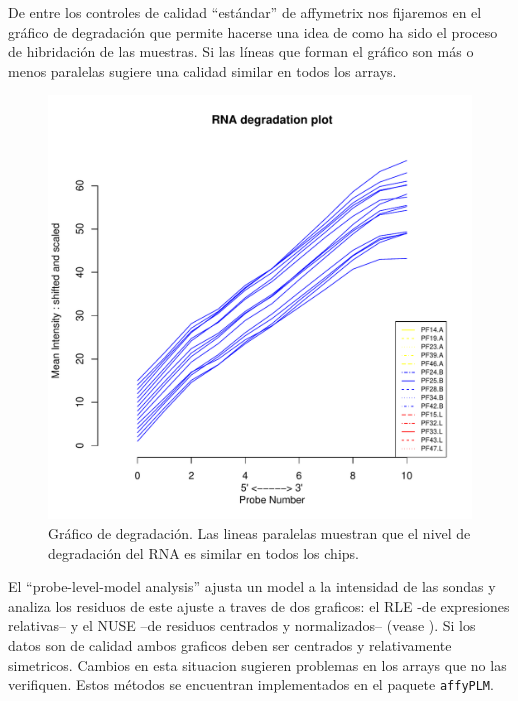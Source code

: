 \documentclass[a4paper]{article}\usepackage[]{graphicx}\usepackage[]{color}
\makeatletter
\def\maxwidth{ %
  \ifdim\Gin@nat@width>\linewidth
    \linewidth
  \else
    \Gin@nat@width
  \fi
}
\newenvironment{knitrout}{}{} %
\newcommand{\Rpackage}[1]{{\texttt{#1}}}
\makeatother
\begin{document}
De entre los controles de calidad ``estándar'' de affymetrix nos fijaremos en el gráfico de degradación que permite hacerse una idea de como ha sido el 
proceso de hibridación de las muestras. Si las líneas que forman el gráfico son más o menos paralelas sugiere una calidad similar en todos los arrays.



\begin{figure}[htbp]
 \centering
\begin{knitrout}
\color{fgcolor}
\includegraphics[width=\maxwidth]{images/graficplotDeg-1} 

\end{knitrout}
\caption{Gráfico de degradación. Las lineas paralelas muestran que el nivel de degradación del RNA es similar en todos los chips.}
\label{fig:degeadationPlot}
\end{figure}

El ``probe-level-model analysis'' ajusta un model a la intensidad de las sondas y analiza los residuos de este ajuste a traves de dos graficos: el RLE -de expresiones relativas-- y el NUSE --de residuos centrados y normalizados-- (vease \cite{Gentleman:2005}). 
Si los datos son de calidad ambos graficos deben ser centrados y relativamente simetricos. Cambios en esta situacion sugieren problemas en los arrays que no las verifiquen. Estos métodos se encuentran implementados en el paquete \Rpackage{affyPLM}.
\end{document}
